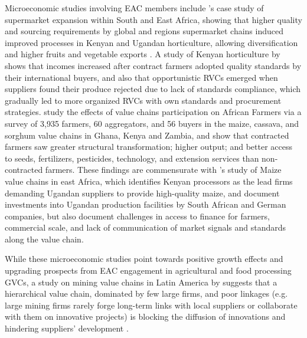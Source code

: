 \documentclass[a4paper]{article}
\begin{document}
Microeconomic studies involving EAC members include \citet{barrientos2016shifting}'s case study of supermarket expansion within South and East Africa, showing that higher quality and sourcing requirements by global and regions supermarket chains induced improved processes in Kenyan and Ugandan horticulture, allowing diversification and higher fruits and vegetable exports \citep{world2020trading}. A study of Kenyan horticulture by \citet{krishnan2018origin} shows that incomes increased after contract farmers adopted quality standards by their international buyers, and also that opportunistic RVCs emerged when suppliers found their produce rejected due to lack of standards compliance, which gradually led to more organized RVCs with own standards and procurement strategies. \citet{dihel2018does} study the effects of value chains participation on African Farmers via a survey of 3,935 farmers, 60 aggregators, and 56 buyers in the maize, cassava, and sorghum value chains in Ghana, Kenya and Zambia, and show that contracted farmers saw greater structural transformation; higher output; and better access to seeds, fertilizers, pesticides, technology, and extension services than non-contracted farmers. These findings are commensurate with \citet{daly2016maize}'s study of Maize value chains in east Africa, which identifies Kenyan processors as the lead firms demanding Ugandan suppliers to provide high-quality maize, and document investments into Ugandan production facilities by South African and German companies, but also document challenges in access to finance for farmers, commercial scale, and lack of communication of market signals and standards along the value chain.    \newline

While these microeconomic studies point towards positive growth effects and upgrading prospects from EAC  engagement in agricultural and food processing GVCs, a study on mining value chains in Latin America by \citet{pietrobelli2018innovation} suggests that a hierarchical value chain, dominated by few large firms, and poor linkages (e.g. large mining firms rarely forge long-term links with local suppliers or collaborate with them on innovative projects) is blocking the diffusion of innovations and hindering suppliers’ development \citep{pietrobelli2018innovation, world2020trading}. 


\end{document}

